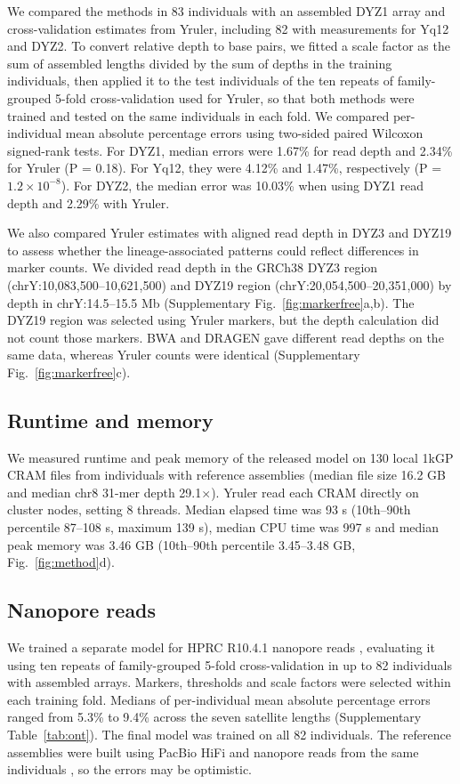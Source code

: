 We compared the methods in 83 individuals with an assembled DYZ1 array and cross-validation estimates from Yruler, including 82 with measurements for Yq12 and DYZ2. To convert relative depth to base pairs, we fitted a scale factor as the sum of assembled lengths divided by the sum of depths in the training individuals, then applied it to the test individuals of the ten repeats of family-grouped 5-fold cross-validation used for Yruler, so that both methods were trained and tested on the same individuals in each fold. We compared per-individual mean absolute percentage errors using two-sided paired Wilcoxon signed-rank tests. For DYZ1, median errors were 1.67\% for read depth and 2.34\% for Yruler (P = 0.18). For Yq12, they were 4.12\% and 1.47\%, respectively (P = $1.2\times10^{-8}$). For DYZ2, the median error was 10.03\% when using DYZ1 read depth and 2.29\% with Yruler.

We also compared Yruler estimates with aligned read depth in DYZ3 and DYZ19 to assess whether the lineage-associated patterns could reflect differences in marker counts. We divided read depth in the GRCh38 DYZ3 region (chrY:10,083,500--10,621,500) and DYZ19 region (chrY:20,054,500--20,351,000) by depth in chrY:14.5--15.5 Mb (Supplementary Fig.~\ref{fig:markerfree}a,b). The DYZ19 region was selected using Yruler markers, but the depth calculation did not count those markers. BWA and DRAGEN gave different read depths on the same data, whereas Yruler counts were identical (Supplementary Fig.~\ref{fig:markerfree}c).

\subsection{Runtime and memory}\label{sec:m-cost}
We measured runtime and peak memory of the released model on 130 local 1kGP CRAM files from individuals with reference assemblies (median file size 16.2 GB and median chr8 31-mer depth 29.1$\times$). Yruler read each CRAM directly on cluster nodes, setting 8 threads. Median elapsed time was 93 s (10th--90th percentile 87--108 s, maximum 139 s), median CPU time was 997 s and median peak memory was 3.46 GB (10th--90th percentile 3.45--3.48 GB, Fig.~\ref{fig:method}d).

\subsection{Nanopore reads}\label{sec:m-ont}
We trained a separate model for HPRC R10.4.1 nanopore reads \cite{HPRCRelease2}, evaluating it using ten repeats of family-grouped 5-fold cross-validation in up to 82 individuals with assembled arrays. Markers, thresholds and scale factors were selected within each training fold. Medians of per-individual mean absolute percentage errors ranged from 5.3\% to 9.4\% across the seven satellite lengths (Supplementary Table~\ref{tab:ont}). The final model was trained on all 82 individuals. The reference assemblies were built using PacBio HiFi and nanopore reads from the same individuals \cite{Hallast2026,HPRCRelease2}, so the errors may be optimistic.

